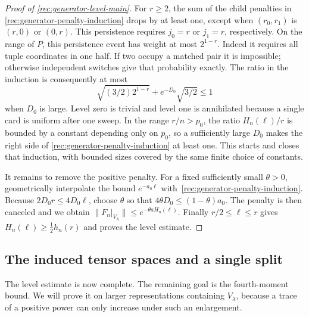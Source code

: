 \begin{proof}[Proof of \eqref{rec:generator-level-main}]
For $r\ge2$, the sum of the child penalties in
\eqref{rec:generator-penalty-induction} drops by at least one,
except when $(r_0,r_1)$ is $(r,0)$ or $(0,r)$.  This persistence
requires $j_0=r$ or $j_1=r$, respectively.  On the range
of $P$, this persistence event has weight at most $2^{1-r}$.
Indeed it requires all tuple coordinates in one half.  If two occupy
a matched pair it is impossible; otherwise independent switches give
that probability exactly.  The ratio in the induction is consequently
at most
\[
 \sqrt{(3/2)2^{1-r}}+e^{-D_0}\sqrt{3/2}\le1
\]
when $D_0$ is large.  Level zero is trivial and level one is annihilated because a single
card is uniform after one sweep.  In the range $r/n>p_0$, the ratio
$H_n(\ell)/r$ is bounded by a constant depending only on $p_0$,
so a sufficiently large $D_0$ makes the right side of
\eqref{rec:generator-penalty-induction} at least one.  This starts
and closes that induction, with bounded sizes covered by the same
finite choice of constants.

It remains to remove the positive penalty.  For a fixed sufficiently
small $\theta>0$, geometrically interpolate the bound
$e^{-a_0\ell}$ with~\eqref{rec:generator-penalty-induction}.
Because $2D_0r\le4D_0\ell$, choose $\theta$ so that
$4\theta D_0\le(1-\theta)a_0$.  The penalty is then canceled and
we obtain $\|F_n|_{V_\lambda}\|\le e^{-\theta aH_n(\ell)}$.
Finally $r/2\le\ell\le r$ gives
$H_n(\ell)\ge\tfrac12h_n(r)$ and proves the level estimate.
\end{proof}

\subsection{The induced tensor spaces and a single split}

The level estimate is now complete.  The remaining goal is the
fourth-moment bound.  We will prove it on larger representations containing
$V_\lambda$, because a trace of a positive power can only increase under
such an enlargement.

